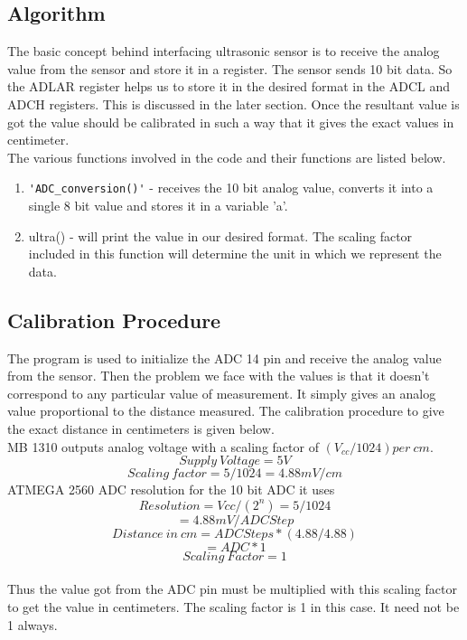 \documentclass[a4paper,29.6pt]{article}
\begin{document}
\subsection{Algorithm}
\begin{small}
	The basic concept behind interfacing ultrasonic sensor is to receive the analog value from the sensor and store it in a register. The sensor sends 10 bit data. So the ADLAR register helps us to store it in the desired format in the ADCL and ADCH registers. This is discussed in the later section. Once the resultant value is got the value should be calibrated in such a way that it gives the exact values in centimeter. \\
	The various functions involved in the code and their functions are listed below.
	\begin{enumerate}
	\item \verb"'ADC_conversion()'" - receives the 10 bit analog value, converts it into a single 8 bit value and stores it in a variable 'a'.
	\item ultra() - will print the value in our desired format. The scaling factor included in this function will determine the unit in which we represent the data.
	\end{enumerate}
	\end{small}



\subsection{Calibration Procedure}
\begin{small}
The program is used to initialize the ADC 14 pin and receive the analog value from the sensor. Then the problem we face with the values is that it doesn't correspond to any particular value of measurement. It simply gives an analog value proportional to the distance measured. The calibration procedure to give the exact distance in centimeters is given below.\\
MB 1310 outputs analog voltage with a scaling factor of $(V_{cc}/1024)per\: cm$.
	 $$Supply\: Voltage = 5V$$
		 $$Scaling\: factor= 5/1024 = 4.88mV/cm$$
		 ATMEGA 2560 ADC resolution for the 10 bit ADC it uses $$ Resolution = Vcc/(2^n) =5/1024$$ $$= 4.88mV/ADC Step$$
		 $$Distance\: in\: cm = ADC Steps * (4.88/4.88)$$ $$= ADC * 1$$ 
		 $$Scaling\: Factor = 1$$\\
		Thus the value got from the ADC pin must be multiplied with this scaling factor to get the value in centimeters. The scaling factor is 1 in this case. It need not be 1 always.
\end{small}
\end{document}

